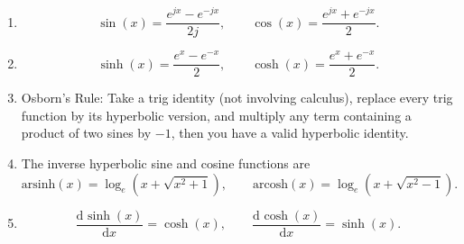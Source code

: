 \documentclass{article}
\newcommand{\deriv}[3][]{\frac{\mathrm{d}^{#1} #2}{\mathrm{d}#3^{#1}}}
\newcommand{\arsinh}{\mathrm{arsinh}}
\newcommand{\arcosh}{\mathrm{arcosh}}
\begin{document}
\begin{enumerate}
	\item \[\sin(x)=\frac{e^{jx}-e^{-jx}}{2j},\qquad \cos(x)=\frac{e^{jx}+e^{-jx}}{2}.\]
	\item \[\sinh(x)=\frac{e^x-e^{-x}}{2},\qquad \cosh(x)=\frac{e^x+e^{-x}}{2}.\]
	\item Osborn's Rule: Take a trig identity (not involving calculus), replace every trig function by its hyperbolic version, and multiply any term containing a product of two sines by $-1$, then you have a valid hyperbolic identity.
	\item The inverse hyperbolic sine and cosine functions are
		\[\arsinh(x)=\log_e\left(x+\sqrt{x^2+1}\right),\qquad\arcosh(x)=\log_e\left(x+\sqrt{x^2-1}\right).\]
	\item \[\deriv{\sinh(x)}{x}=\cosh(x),\qquad \deriv{\cosh(x)}{x}=\sinh(x).\]
\end{enumerate}
\end{document}
